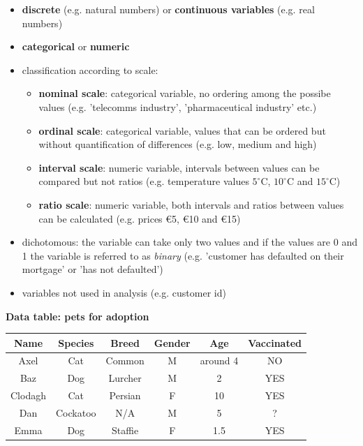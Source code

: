 \begin{itemize}
\item \textbf{discrete} (e.g. natural numbers) or \textbf{continuous variables} (e.g. real numbers)
\item \textbf{categorical} or \textbf{numeric}
\item classification according to scale:
\begin{itemize}
\item \textbf{nominal scale}: categorical variable, no ordering among the possibe values (e.g. 'telecomms industry', 'pharmaceutical industry' etc.)
\item \textbf{ordinal scale}: categorical variable, values that can be ordered but without quantification of differences (e.g. low, medium and high)
\item \textbf{interval scale}: numeric variable, intervals between values can be compared but not ratios (e.g. temperature values $5^{\circ}$C, $10^{\circ}$C and $15^{\circ}$C)
\item \textbf{ratio scale}: numeric variable, both intervals and ratios between values can be calculated (e.g. prices \euro 5, \euro 10 and \euro 15)
\end{itemize}
\item dichotomous: the variable can take only two values and if the values are 0 and 1 the variable is referred to as \textit{binary} (e.g. 'customer has defaulted on their mortgage' or 'has not defaulted')
\item variables not used in analysis (e.g. customer id)
\end{itemize}
\newpage

\bgroup
\begin{center} 
{\bfseries \large Data table: pets for adoption} \\
\def\arraystretch{1.5}
\begin{tabular}{c c c c c c} 
\hline
\textbf{Name} & \textbf{Species} & \textbf{Breed} & \textbf{Gender} & \textbf{Age} & \textbf{Vaccinated} \\
\hline
Axel & Cat & Common & M & around 4 & NO \\
Baz & Dog & Lurcher & M & 2 & YES \\
Clodagh & Cat & Persian & F & 10 & YES \\
Dan & Cockatoo & N/A & M & 5 & ? \\
Emma & Dog & Staffie & F & 1.5 & YES \\
\hline
\end{tabular}
\end{center} 
\egroup
\newpage

